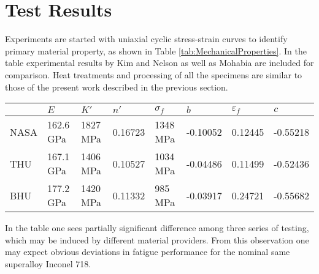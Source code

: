 \documentclass[preprint,5p,twocolumn,11pt,sort&compress]{elsarticle}
\begin{document}
\section{ Test Results}
Experiments are started with uniaxial cyclic stress-strain curves to identify primary material property, as shown in Table \ref{tab:MechanicalProperties}. In the table experimental results by Kim \cite{kim1988elevated} and Nelson  \cite{nelson1992creep} as well as Mohabia \cite{Mahobia2014}  are included for comparison.
Heat treatments and processing of all the specimens are similar to those of the present work described in the previous section.

\begin{table*}[htbp]
  \centering
  \caption{Basic properties of Nickel-based superalloy Inconel 718 at 650$^{\circ}$C.}
    \begin{tabular}{llllllll}
    \hline
          & $E$     & $K'$     & $n'$     & $\sigma_f$    & $b$     & $\varepsilon_f$    & $c$ \\
    \hline
    NASA \cite{kim1988elevated, nelson1992creep}  & 162.6 GPa & 1827 MPa  & 0.16723 & 1348 MPa & -0.10052 & 0.12445 & -0.55218 \\
    THU   & 167.1 GPa & 1406 MPa  & 0.10527 & 1034 MPa & -0.04486 & 0.11499 & -0.52436 \\
    BHU \cite{Mahobia2014}   & 177.2 GPa & 1420 MPa  & 0.11332 & 985 MPa & -0.03917 & 0.24721 & -0.55682 \\
    \hline
    \end{tabular}%
  \label{tab:MechanicalProperties}%
\end{table*}%

In the table one sees partially significant difference among three series of testing, which may be induced by different material providers.  From this observation one may expect obvious deviations in fatigue performance for the nominal same superalloy Inconel 718.
\end{document}
